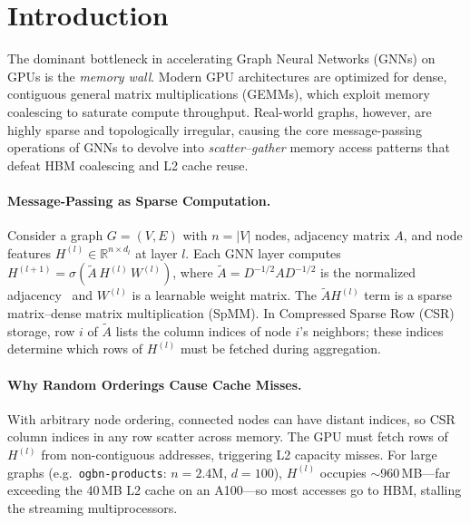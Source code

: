 \documentclass[sigconf,review]{acmart}
\begin{document}
\maketitle
\sloppy

\section{Introduction}

The dominant bottleneck in accelerating Graph Neural Networks (GNNs) on GPUs is the \emph{memory wall}. Modern GPU architectures are optimized for dense, contiguous general matrix multiplications (GEMMs), which exploit memory coalescing to saturate compute throughput. Real-world graphs, however, are highly sparse and topologically irregular, causing the core message-passing operations of GNNs to devolve into \emph{scatter--gather} memory access patterns that defeat HBM coalescing and L2 cache reuse.

\paragraph{Message-Passing as Sparse Computation.}
Consider a graph $G = (V, E)$ with $n = |V|$ nodes, adjacency matrix $A$, and node features $H^{(l)} \in \mathbb{R}^{n \times d_l}$ at layer $l$. Each GNN layer computes $H^{(l+1)} = \sigma(\tilde{A}\,H^{(l)}\,W^{(l)})$, where $\tilde{A} = D^{-1/2}AD^{-1/2}$ is the normalized adjacency~\cite{kipf2017gcn} and $W^{(l)}$ is a learnable weight matrix. The $\tilde{A}H^{(l)}$ term is a sparse matrix--dense matrix multiplication (SpMM). In Compressed Sparse Row (CSR) storage, row $i$ of $\tilde{A}$ lists the column indices of node $i$'s neighbors; these indices determine which rows of $H^{(l)}$ must be fetched during aggregation.

\paragraph{Why Random Orderings Cause Cache Misses.}
With arbitrary node ordering, connected nodes can have distant indices, so CSR column indices in any row scatter across memory. The GPU must fetch rows of $H^{(l)}$ from non-contiguous addresses, triggering L2 capacity misses. For large graphs (e.g.\ \texttt{ogbn-products}: $n{=}2.4$M, $d{=}100$), $H^{(l)}$ occupies $\sim$960\,MB---far exceeding the 40\,MB L2 cache on an A100---so most accesses go to HBM, stalling the streaming multiprocessors.
\end{document}
